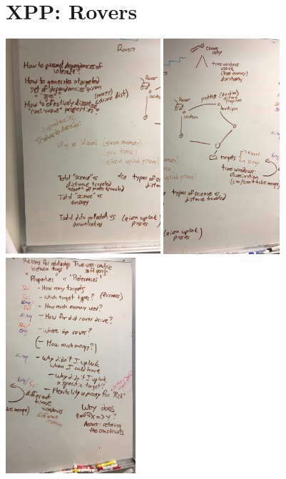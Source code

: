 \section{XPP: Rovers}
\label{xpp-rovers}


\includegraphics[height=8.0cm]{IMAGES/jeremy-whiteboard-rovers-1.JPG}
\includegraphics[height=8.0cm]{IMAGES/jeremy-whiteboard-rovers-2.JPG}
\includegraphics[height=8.0cm]{IMAGES/jeremy-whiteboard-rovers-3.JPG}


